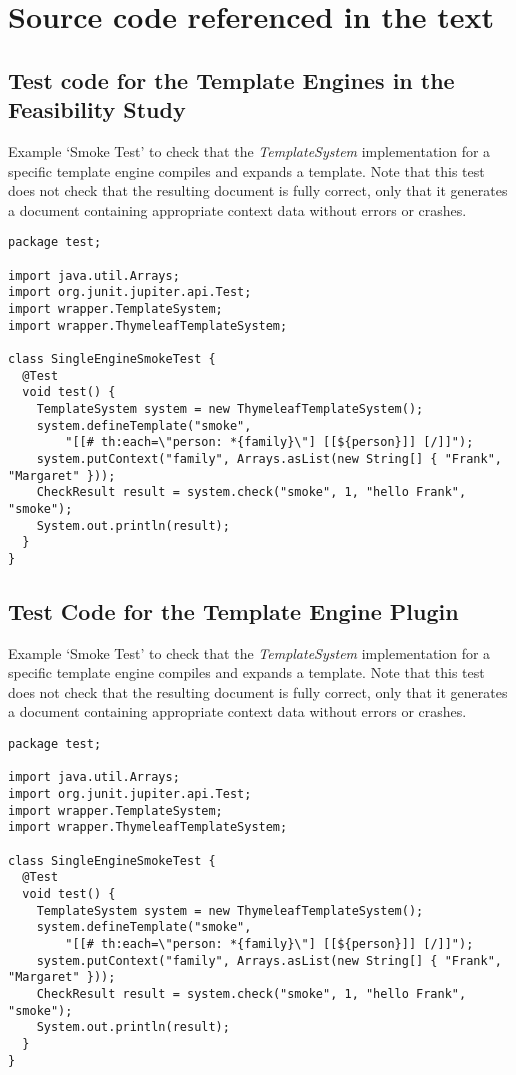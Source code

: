 \chapter{Source code referenced in the text}
\label{appendix:sourcecode}

\verbatimfont{\footnotesize}

\section*{Test code for the Template Engines in the Feasibility Study}
\label{appendix:smoketest}

Example `Smoke Test' to check that the \emph{TemplateSystem} implementation for a specific template engine compiles and expands a template. Note that this test does not check that the resulting document is fully correct, only that it generates a document containing appropriate context data without errors or crashes.

\begin{verbatim}
package test;

import java.util.Arrays;
import org.junit.jupiter.api.Test;
import wrapper.TemplateSystem;
import wrapper.ThymeleafTemplateSystem;

class SingleEngineSmokeTest {
  @Test
  void test() {
    TemplateSystem system = new ThymeleafTemplateSystem();
    system.defineTemplate("smoke", 
        "[[# th:each=\"person: *{family}\"] [[${person}]] [/]]");
    system.putContext("family", Arrays.asList(new String[] { "Frank", "Margaret" }));
    CheckResult result = system.check("smoke", 1, "hello Frank", "smoke");
    System.out.println(result);
  }
}
\end{verbatim}

\section*{Test Code for the Template Engine Plugin}
\label{appendix:plugintest}

Example `Smoke Test' to check that the \emph{TemplateSystem} implementation for a specific template engine compiles and expands a template. Note that this test does not check that the resulting document is fully correct, only that it generates a document containing appropriate context data without errors or crashes.

\begin{verbatim}
package test;

import java.util.Arrays;
import org.junit.jupiter.api.Test;
import wrapper.TemplateSystem;
import wrapper.ThymeleafTemplateSystem;

class SingleEngineSmokeTest {
  @Test
  void test() {
    TemplateSystem system = new ThymeleafTemplateSystem();
    system.defineTemplate("smoke", 
        "[[# th:each=\"person: *{family}\"] [[${person}]] [/]]");
    system.putContext("family", Arrays.asList(new String[] { "Frank", "Margaret" }));
    CheckResult result = system.check("smoke", 1, "hello Frank", "smoke");
    System.out.println(result);
  }
}
\end{verbatim}

